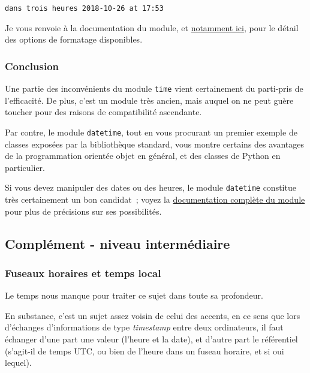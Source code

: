     \begin{Verbatim}[commandchars=\\\{\}]
dans trois heures 2018-10-26 at 17:53

    \end{Verbatim}

    Je vous renvoie à la documentation du module, et
\href{https://docs.python.org/3/library/datetime.html\#strftime-and-strptime-behavior}{notamment
ici}, pour le détail des options de formatage disponibles.

    \hypertarget{conclusion}{%
\subsubsection{Conclusion}\label{conclusion}}

    Une partie des inconvénients du module \texttt{time} vient certainement
du parti-pris de l'efficacité. De plus, c'est un module très ancien,
mais auquel on ne peut guère toucher pour des raisons de compatibilité
ascendante.

Par contre, le module \texttt{datetime}, tout en vous procurant un
premier exemple de classes exposées par la bibliothèque standard, vous
montre certains des avantages de la programmation orientée objet en
général, et des classes de Python en particulier.

Si vous devez manipuler des dates ou des heures, le module
\texttt{datetime} constitue très certainement un bon candidat~; voyez la
\href{https://docs.python.org/3/library/datetime.html}{documentation
complète du module} pour plus de précisions sur ses possibilités.

    \hypertarget{compluxe9ment---niveau-intermuxe9diaire}{%
\subsection{Complément - niveau
intermédiaire}\label{compluxe9ment---niveau-intermuxe9diaire}}

    \hypertarget{fuseaux-horaires-et-temps-local}{%
\subsubsection{Fuseaux horaires et temps
local}\label{fuseaux-horaires-et-temps-local}}

    Le temps nous manque pour traiter ce sujet dans toute sa profondeur.

En substance, c'est un sujet assez voisin de celui des accents, en ce
sens que lors d'échanges d'informations de type \emph{timestamp} entre
deux ordinateurs, il faut échanger d'une part une valeur (l'heure et la
date), et d'autre part le référentiel (s'agit-il de temps UTC, ou bien
de l'heure dans un fuseau horaire, et si oui lequel).


